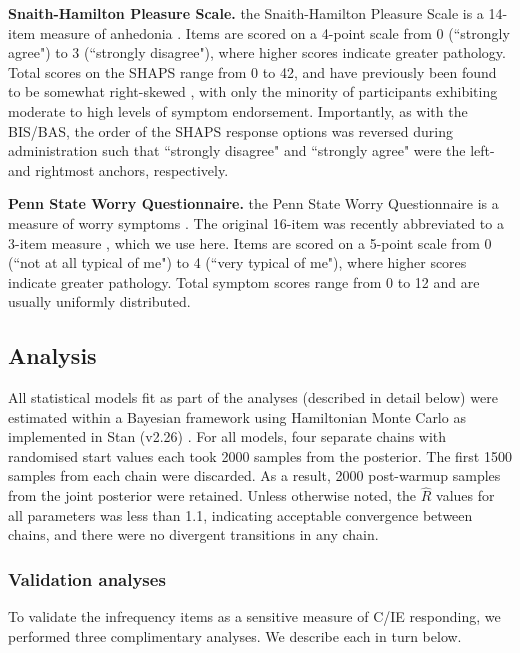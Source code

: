 \documentclass[a4paper,notitlepage,12pt]{article}
\begin{document}
\begin{refsection}[main]
\textbf{Snaith-Hamilton Pleasure Scale.} the Snaith-Hamilton Pleasure Scale is a 14-item measure of anhedonia \cite{snaith1995scale}. Items are scored on a 4-point scale from 0 (``strongly agree") to 3 (``strongly disagree"), where higher scores indicate greater pathology. Total scores on the SHAPS range from 0 to 42, and have previously been found to be somewhat right-skewed \cite{franken2007assessment, leventhal2015measuring}, with only the minority of participants exhibiting moderate to high levels of symptom endorsement. Importantly, as with the BIS/BAS, the order of the SHAPS response options was reversed during administration such that ``strongly disagree" and ``strongly agree" were the left- and rightmost anchors, respectively.

\textbf{Penn State Worry Questionnaire.} the Penn State Worry Questionnaire is a measure of worry symptoms \cite{meyer1990development}. The original 16-item was recently abbreviated to a 3-item measure \cite{kertz2014psychometric}, which we use here. Items are scored on a 5-point scale from 0 (``not at all typical of me") to 4 (``very typical of me"), where higher scores indicate greater pathology. Total symptom scores range from 0 to 12 and are usually uniformly distributed.

\subsection*{Analysis}

All statistical models fit as part of the analyses (described in detail below) were estimated within a Bayesian framework using Hamiltonian Monte Carlo as implemented in Stan (v2.26) \cite{stan}. For all models, four separate chains with randomised start values each took 2000 samples from the posterior. The first 1500 samples from each chain were discarded. As a result, 2000 post-warmup samples from the joint posterior were retained. Unless otherwise noted, the $\hat{R}$ values for all parameters was less than 1.1, indicating acceptable convergence between chains, and there were no divergent transitions in any chain. 

\subsubsection*{Validation analyses}

To validate the infrequency items as a sensitive measure of C/IE responding, we performed three complimentary analyses. We describe each in turn below.


\end{refsection}
\end{document}
